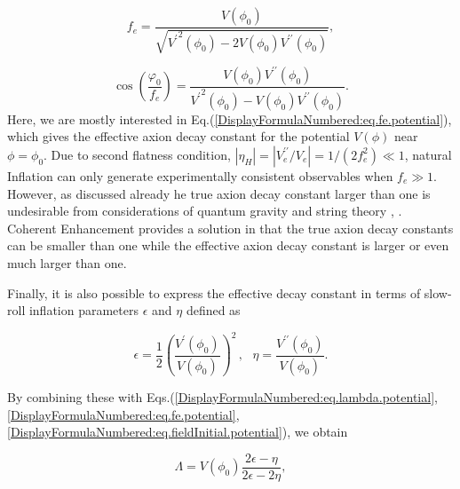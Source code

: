 \documentclass[12pt]{article}
\begin{document}
\begin{equation}\label{DisplayFormulaNumbered:eq.fe.potential} 
	f_e=\frac{V\left(\phi_0\right)}{\sqrt{{V^\prime}^2\left(\phi_0\right)-2V\left(\phi_0\right)V^{\prime\prime} \left(\phi_0\right)}},
\end{equation}

\begin{equation}\label{DisplayFormulaNumbered:eq.fieldInitial.potential} 
	\cos\left(\frac{\varphi_0}{f_e}\right)=\frac{V\left(\phi_0\right)V^{\prime\prime} \left(\phi_0\right)}{{V^\prime}^2\left(\phi_0\right)-V\left(\phi_0\right)V^{\prime\prime} \left(\phi_0\right)}.
\end{equation}
Here, we are mostly interested in Eq.(\ref{DisplayFormulaNumbered:eq.fe.potential}), which gives  the effective axion decay constant for the potential $V\left(\phi \right)$ near $\phi =\phi_0$.
Due to second flatness condition, $\left|\eta_H\right|=\left| V_e^{\prime\prime} /V_e \right|=1/\left(2f_e^2\right) \ll 1$, natural Inflation can only generate experimentally consistent observables when $f_e \gg 1$. However, as discussed already he true axion decay constant larger than one is undesirable from considerations of quantum gravity and string theory \cite{Kallosh:1995hi}, \cite{Banks:2003sx}. Coherent Enhancement provides a solution in that the true axion decay constants can be  smaller than one while the effective axion decay constant is larger or even much
larger than one.

Finally, it is also possible to express the effective decay constant in terms of slow-roll inflation parameters $\epsilon$ and $\eta$ defined as

\begin{equation}\label{DisplayFormulaNumbered:eq.epsilonV} 
	\epsilon=\frac{1}{2}{\left(\frac{V^\prime \left(\phi_0\right)}{V\left(\phi_0\right)}\right)}^2\,, 
	~~~\eta=\frac{V^{\prime\prime} \left(\phi_0\right)}{V\left(\phi_0\right)}.
\end{equation}

By combining these with Eqs.(\ref{DisplayFormulaNumbered:eq.lambda.potential}, \ref{DisplayFormulaNumbered:eq.fe.potential}, \ref{DisplayFormulaNumbered:eq.fieldInitial.potential}), we obtain

\begin{equation}\label{DisplayFormulaNumbered:eq.lambda.slowRoll} 
	\Lambda =V\left(\phi_0\right)\frac{2\epsilon-\eta}{2\epsilon-2\eta},
\end{equation}
\end{document}
